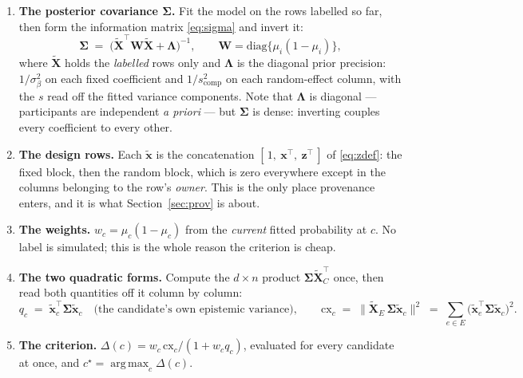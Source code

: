 \documentclass[11pt]{article}
\newcommand{\bx}{\bm{x}}
\newcommand{\bz}{\bm{z}}
\newcommand{\bS}{\bm{\Sigma}}
\newcommand{\bL}{\bm{\Lambda}}
\newcommand{\bW}{\bm{W}}
\newcommand{\bX}{\bm{X}}
\DeclareMathOperator*{\argmax}{arg\,max}
\begin{document}
\begin{enumerate}
  \item\textbf{The posterior covariance $\bS$.} Fit the model on the rows labelled so far, then
        form the information matrix \eqref{eq:sigma} and invert it:
        \[
          \bS \;=\; \big(\tilde{\bX}^{\!\top}\bW\tilde{\bX} + \bL\big)^{-1},
          \qquad \bW = \mathrm{diag}\{\mu_i(1-\mu_i)\},
        \]
        where $\tilde{\bX}$ holds the \emph{labelled} rows only and $\bL$ is the diagonal prior
        precision: $1/\sigma_\beta^2$ on each fixed coefficient and $1/s_{\text{comp}}^2$ on
        each random-effect column, with the $s$ read off the fitted variance components. Note
        that $\bL$ is diagonal --- participants are independent \emph{a priori} --- but $\bS$ is
        dense: inverting couples every coefficient to every other.
  \item\textbf{The design rows.} Each $\tilde{\bx}$ is the concatenation
        $[\,1,\ \bx^{\!\top},\ \bz^{\!\top}\,]$ of \eqref{eq:zdef}: the fixed block, then the
        random block, which is zero everywhere except in the columns belonging to the row's
        \emph{owner}. This is the only place provenance enters, and it is what
        Section~\ref{sec:prov} is about.
  \item\textbf{The weights.} $w_c = \mu_c(1-\mu_c)$ from the \emph{current} fitted probability
        at $c$. No label is simulated; this is the whole reason the criterion is cheap.
  \item\textbf{The two quadratic forms.} Compute the $d\times n$ product
        $\bS\tilde{\bX}_C^{\!\top}$ once, then read both quantities off it column by column:
        \[
          q_c \;=\; \tilde{\bx}_c^{\!\top}\bS\tilde{\bx}_c
          \quad\text{(the candidate's own epistemic variance)},
          \qquad
          \mathrm{cx}_c \;=\; \big\|\tilde{\bX}_E\,\bS\tilde{\bx}_c\big\|^2
          \;=\;\sum_{e\in E}\big(\tilde{\bx}_e^{\!\top}\bS\tilde{\bx}_c\big)^2 .
        \]
  \item\textbf{The criterion.} $\Delta(c) = w_c\,\mathrm{cx}_c/(1 + w_c q_c)$, evaluated for
        every candidate at once, and $c^\star=\argmax_c\Delta(c)$.
\end{enumerate}
\end{document}
